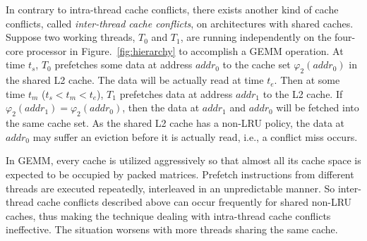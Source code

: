 In contrary to intra-thread cache conflicts,
there exists another kind of cache conflicts, called
\emph{inter-thread cache conflicts}, on architectures with shared caches.
Suppose two working threads, $T_0$ and $T_1$, are running independently
on the four-core processor in Figure.~\ref{fig:hierarchy}
to accomplish a GEMM operation.
At time $t_s$, $T_0$ prefetches some data at address $addr_0$
to the cache set $\varphi_2(addr_0)$ in the shared L2 cache.
The data will be actually read at time $t_e$.
Then at some time $t_m$ ($t_s < t_m < t_e$),
$T_1$ prefetches data at address $addr_1$ to the L2 cache.
If $\varphi_2(addr_1)=\varphi_2(addr_0)$, then the
data at $addr_1$ and $addr_0$ will be fetched into the same cache set.
As the shared L2 cache has a non-LRU policy,
the data at $addr_0$ may suffer an eviction before it is actually read,
i.e., a conflict miss occurs.

In GEMM, every cache is utilized aggressively
so that almost all its cache space is expected to be occupied by packed matrices.
Prefetch instructions from different threads are executed repeatedly,
interleaved in an unpredictable manner.
So inter-thread cache conflicts described above
can occur frequently for shared non-LRU caches,
thus making the technique dealing with intra-thread cache conflicts ineffective.
The situation worsens with more threads sharing the same cache.

